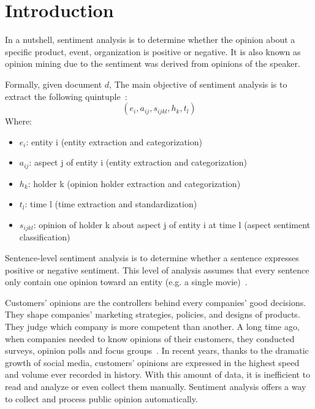 \section{Introduction}
In a nutshell, sentiment analysis is to determine whether the opinion about a specific product, event, organization is positive or negative. 
It is also known as opinion mining due to the sentiment was derived from opinions of the speaker.

Formally, given document $d$, The main objective of sentiment analysis is to extract the following quintuple~\cite{liu2012sentiment}:
\[ ( e_{i}, a_{ij}, s_{ijkl}, h_{k}, t_{l} ) \]
Where:
\begin{itemize}
	\item $e_{i}$: entity i (entity extraction and categorization)
	\item $a_{ij}$: aspect j of entity i (entity extraction and categorization)
	\item $h_{k}$: holder k (opinion holder extraction and categorization)
	\item $t_{l}$: time l (time extraction and standardization)
	\item $s_{ijkl}$: opinion of holder k about aspect j of entity i at time l (aspect sentiment classification)
\end{itemize}
Sentence-level sentiment analysis is to determine whether a sentence expresses positive or negative sentiment. 
This level of analysis assumes that every sentence only contain one opinion toward an entity (e.g. a single movie)~\cite{liu2012sentiment}.

Customers' opinions are the controllers behind every companies' good decisions.
They shape companies' marketing strategies, policies, and designs of products.
They judge which company is more competent than another.
A long time ago, when companies needed to know opinions of their customers, they conducted surveys, opinion polls and focus groups~\cite{liu2012sentiment}.
In recent years, thanks to the dramatic growth of social media, customers' opinions are expressed in the highest speed and volume ever recorded in history.
With this amount of data, it is inefficient to read and analyze or even collect them manually. 
Sentiment analysis offers a way to collect and process public opinion automatically.

